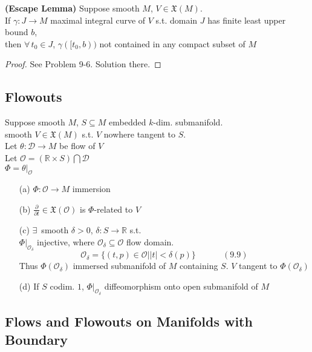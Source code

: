 \begin{lemma}[9.19] \textbf{(Escape Lemma)}
Suppose smooth $M$, $V\in \mathfrak{X}(M)$.  \\
If $\gamma: J \to M$ maximal integral curve of $V$ s.t. domain $J$ has finite least upper bound $b$, \\
\phantom{ \quad \, } then $\forall \, t_0 \in J$, $\gamma([t_0,b))$ not contained in any compact subset of $M$
\end{lemma}

\begin{proof}
See Problem 9-6.  Solution there.  
\end{proof}

\subsection*{Flowouts}

Suppose smooth $M$, $S\subseteq M$ embedded $k$-dim. submanifold. \\
smooth $V \in \mathfrak{X}(M)$ s.t. $V$ nowhere tangent to $S$.  \\
Let $\theta:\mathcal{D} \to M$ be flow of $V$  \\
Let $\mathcal{O} = (\mathbb{R}\times S) \bigcap \mathcal{D}$ \\
\phantom{Let } $\Phi= \left. \theta \right|_{\mathcal{O}}$
\begin{enumerate}
\item[(a)] $\Phi : \mathcal{O} \to M$ immersion 
\item[(b)] $\frac{ \partial }{ \partial t} \in \mathfrak{X}(\mathcal{O})$ is $\Phi$-related to $V$
\item[(c)] $\exists \, $ smooth $\delta >0$, $\delta : S \to \mathbb{R}$ s.t. \\
$\left. \Phi \right|_{\mathcal{O}_{\delta}}$ injective, where $\mathcal{O}_{\delta} \subseteq \mathcal{O}$ flow domain.  
\begin{equation}
  \mathcal{O}_{\delta} = \lbrace (t,p) \in \mathcal{O} | |t| < \delta(p) \rbrace \quad \quad \quad \, (9.9)
\end{equation}
Thus $\Phi(\mathcal{O}_{\delta})$ immersed submanifold of $M$ containing $S$. $V$ tangent to $\Phi(\mathcal{O}_{\delta})$
\item[(d)] If $S$ codim. $1$, $\left. \Phi \right|_{\mathcal{O}_{\delta}}$ diffeomorphism onto open submanifold of $M$
\end{enumerate}

\subsection*{Flows and Flowouts on Manifolds with Boundary }

